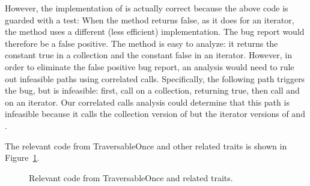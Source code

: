 However, the implementation of  is actually correct because the above
code is guarded with a test:
When the  method returns false, as it does for
an iterator, the  method uses a different
(less efficient) implementation. The bug report would therefore be a false positive. 
The  method is easy to analyze: it returns the constant
true in a collection and the constant false in an iterator. However, in order
to eliminate the false positive bug report, an analysis would need to rule out infeasible
paths using correlated calls. Specifically, the following path triggers the bug, but
is infeasible: first, call  on a collection, returning
true, then call  and  on an iterator. Our correlated
calls analysis could determine that this path is infeasible because it calls the
collection version of  but the iterator versions of
 and .


The relevant code from \textsf{TraversableOnce} and other related traits is shown
in Figure~\ref{fig:traversableonce}.

\begin{figure}
\caption{Relevant code from \textsf{TraversableOnce} and related traits.}
\label{fig:traversableonce}
\end{figure}
